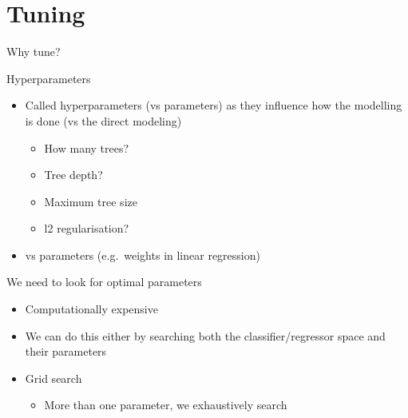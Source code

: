 \documentclass[obeyspaces,aspectratio=43]{beamer}
\providecommand{\tightlist}{%
  \setlength{\itemsep}{0pt}\setlength{\parskip}{0pt}}
\begin{document}
\section{Tuning}\label{tuning}

\begin{frame}{Why tune?}

\end{frame}

\begin{frame}{Hyperparameters}

\begin{itemize}
\tightlist
\item
  Called hyperparameters (vs parameters) as they influence how the
  modelling is done (vs the direct modeling)

  \begin{itemize}
  \tightlist
  \item
    How many trees?
  \item
    Tree depth?
  \item
    Maximum tree size
  \item
    l2 regularisation?
  \end{itemize}
\item
  vs parameters (e.g.~weights in linear regression)
\end{itemize}

\end{frame}

\begin{frame}{We need to look for optimal parameters}

\begin{itemize}
\tightlist
\item
  Computationally expensive
\item
  We can do this either by searching both the classifier/regressor space
  and their parameters
\item
  Grid search

  \begin{itemize}
  \tightlist
  \item
    More than one parameter, we exhaustively search
  \end{itemize}
\end{itemize}

\end{frame}
\end{document}
